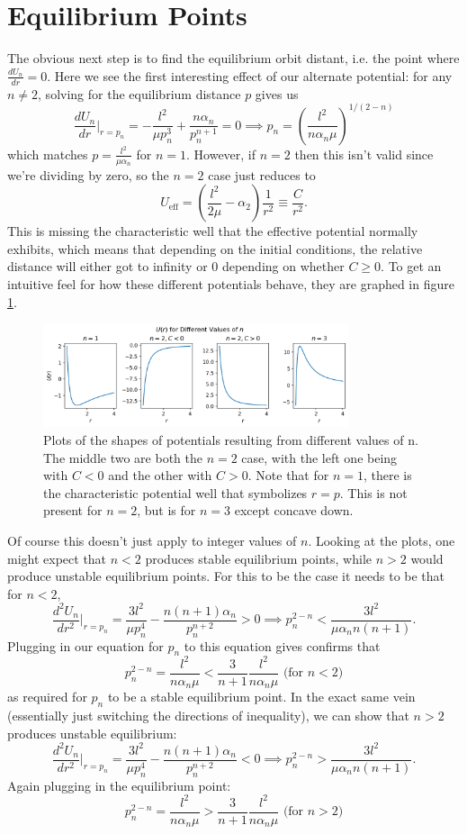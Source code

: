 \documentclass[letterpaper, reqno,11pt]{article}
\begin{document}
\section{Equilibrium Points}

The obvious next step is to find the equilibrium orbit distant, i.e. the point where $\frac{dU_n}{dr}=0$. Here we see the first interesting effect of our alternate potential: for any $n\neq 2$, solving for the equilibrium distance $p$ gives us
\[
\frac{dU_n}{dr}\bigg|_{r=p_n}=-\frac{l^2}{\mu p_n^3}+\frac{n\alpha_n}{p_n^{n+1}}=0\implies p_n=\left( \frac{l^2}{ n\alpha_n\mu} \right)^{1 /(2-n)}
\]
which matches $p=\frac{l^2}{\mu\alpha_n}$ for $n=1$. However, if $n=2$ then this isn't valid since we're dividing by zero, so the $n=2$ case just reduces to
\[
U_{\text{eff}}=\left( \frac{l^2}{2\mu}-\alpha_2 \right)\frac{1}{r^2}\equiv \frac{C}{r^2}
.\]
This is missing the characteristic well that the effective potential normally exhibits, which means that depending on the initial conditions, the relative distance will either got to infinity or $0$ depending on whether $C\geq 0$. To get an intuitive feel for how these different potentials behave, they are graphed in figure \ref{fig:U-plots}. 

\begin{figure}[htpb]
    \centering
    \includegraphics[width=0.8\textwidth]{U-plots}
    \caption{Plots of the shapes of potentials resulting from different values of n. The middle two are both the $n=2$ case, with the left one being with $C<0$ and the other with $C>0$. Note that for $n=1$, there is the characteristic potential well that symbolizes $r=p$. This is not present for $n=2$, but is for $n=3$ except concave down. }
    \label{fig:U-plots}
\end{figure}

Of course this doesn't just apply to integer values of  $n$. Looking at the plots, one might expect that $n<2$ produces stable equilibrium points, while $n>2$ would produce unstable equilibrium points. For this to be the case it needs to be that for $n<2$,  
\[
\frac{d^2U_n}{dr^2}\bigg|_{r=p_n}=\frac{3l^2}{\mu p_n^{4}}-\frac{n(n+1)\alpha_n}{p_n^{n+2}}>0\implies p_n^{2-n}<\frac{3l^2}{\mu\alpha_n n (n+1)}
.\]
Plugging in our equation for $p_n$ to this equation gives confirms that 
\[
p_n^{2-n}=\frac{l^2}{n\alpha_n\mu}< \frac{3}{n+1} \frac{l^2}{n\alpha_n\mu}  \text{ (for $n<2$)}
\]
as required for $p_n$ to be a stable equilibrium point. In the exact same vein (essentially just switching the directions of inequality), we can show that $n>2$ produces unstable equilibrium: 
\[
\frac{d^2U_n}{dr^2}\bigg|_{r=p_n}=\frac{3l^2}{\mu p_n^{4}}-\frac{n(n+1)\alpha_n}{p_n^{n+2}}<0\implies p_n^{2-n}>\frac{3l^2}{\mu\alpha_n n (n+1)}
.\]
Again plugging in the equilibrium point: 
\[
p_n^{2-n}=\frac{l^2}{n\alpha_n\mu}> \frac{3}{n+1} \frac{l^2}{n\alpha_n\mu}  \text{ (for $n>2$)}
\]
\end{document}
